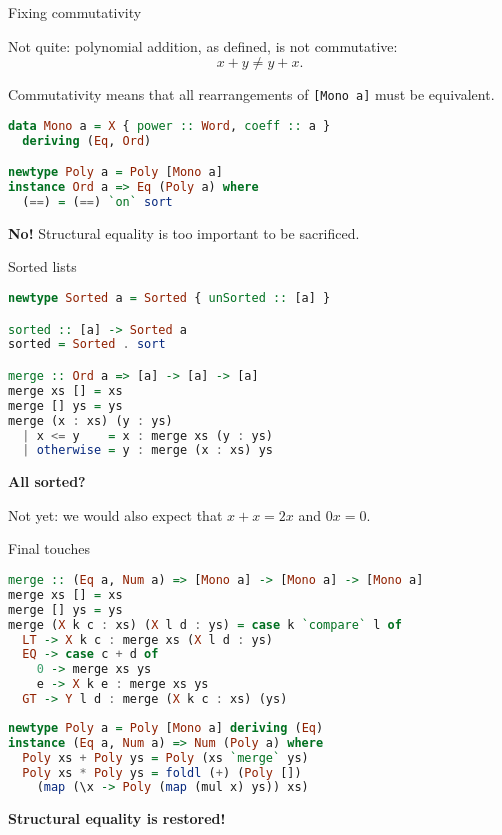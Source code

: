 \documentclass[handout]{beamer}
\begin{document}
\begin{frame}[fragile]{Fixing commutativity}

Not quite: polynomial addition, as defined, is not commutative:
$$ x + y \ne y + x. $$

\pause

Commutativity means that all rearrangements of {\tt [Mono a]} must be equivalent.

\begin{lstlisting}[language=Haskell]
data Mono a = X { power :: Word, coeff :: a }
  deriving (Eq, Ord)

newtype Poly a = Poly [Mono a]
instance Ord a => Eq (Poly a) where
  (==) = (==) `on` sort
\end{lstlisting}

\pause

{\bf No!}
Structural equality is too important to be sacrificed.
\end{frame}

\begin{frame}[fragile]{Sorted lists}

\begin{lstlisting}[language=Haskell]
newtype Sorted a = Sorted { unSorted :: [a] }

sorted :: [a] -> Sorted a
sorted = Sorted . sort

merge :: Ord a => [a] -> [a] -> [a]
merge xs [] = xs
merge [] ys = ys
merge (x : xs) (y : ys)
  | x <= y    = x : merge xs (y : ys)
  | otherwise = y : merge (x : xs) ys
\end{lstlisting}


\medskip

\centerline{\bf All sorted?}

\bigskip

\pause

Not yet: we would also expect that $x+x = 2x$ and $0x = 0$.

\end{frame}

\begin{frame}[fragile]{Final touches}

\begin{lstlisting}[language=Haskell]
merge :: (Eq a, Num a) => [Mono a] -> [Mono a] -> [Mono a]
merge xs [] = xs
merge [] ys = ys
merge (X k c : xs) (X l d : ys) = case k `compare` l of
  LT -> X k c : merge xs (X l d : ys)
  EQ -> case c + d of
    0 -> merge xs ys
    e -> X k e : merge xs ys
  GT -> Y l d : merge (X k c : xs) (ys)
\end{lstlisting}

\pause

\begin{lstlisting}[language=Haskell]
newtype Poly a = Poly [Mono a] deriving (Eq)
instance (Eq a, Num a) => Num (Poly a) where
  Poly xs + Poly ys = Poly (xs `merge` ys)
  Poly xs * Poly ys = foldl (+) (Poly [])
    (map (\x -> Poly (map (mul x) ys)) xs)
\end{lstlisting}

\medskip

\centerline{\bf Structural equality is restored!}

\end{frame}
\end{document}
